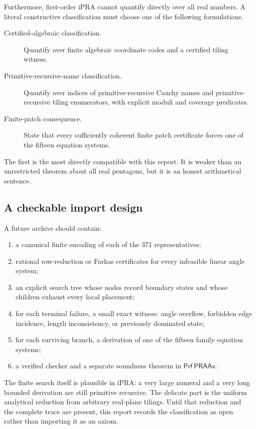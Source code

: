 \documentclass[11pt]{article}
\theoremstyle{remark}
\newcommand{\ipra}{\mathrm{iPRA}}
\newcommand{\Prf}{\mathsf{Prf}}
\newcommand{\PRAAx}{\mathsf{PRAAx}}
\begin{document}
Furthermore, first-order \(\ipra\) cannot quantify directly over all real
numbers.  A literal constructive classification must choose one of the
following formulations.

\begin{description}
\item[Certified-algebraic classification.] Quantify over finite algebraic
coordinate codes and a certified tiling witness.
\item[Primitive-recursive-name classification.] Quantify over indices of
primitive-recursive Cauchy names and primitive-recursive tiling enumerators,
with explicit moduli and coverage predicates.
\item[Finite-patch consequence.] State that every sufficiently coherent
finite patch certificate forces one of the fifteen equation systems.
\end{description}

The first is the most directly compatible with this report.  It is weaker than
an unrestricted theorem about all real pentagons, but it is an honest
arithmetical sentence.

\subsection{A checkable import design}

A future archive should contain:

\begin{enumerate}
\item a canonical finite encoding of each of the 371 representatives;
\item rational row-reduction or Farkas certificates for every infeasible
linear angle system;
\item an explicit search tree whose nodes record boundary states and whose
children exhaust every local placement;
\item for each terminal failure, a small exact witness: angle overflow,
forbidden edge incidence, length inconsistency, or previously dominated state;
\item for each surviving branch, a derivation of one of the fifteen family
equation systems;
\item a verified checker and a separate soundness theorem in
\(\Prf\ \PRAAx\).
\end{enumerate}

The finite search itself is plausible in \(\ipra\): a very large numeral and a
very long bounded derivation are still primitive recursive.  The delicate part
is the uniform analytical reduction from arbitrary real-plane tilings.  Until
that reduction and the complete trace are present, this report records the
classification as open rather than importing it as an axiom.
\end{document}
